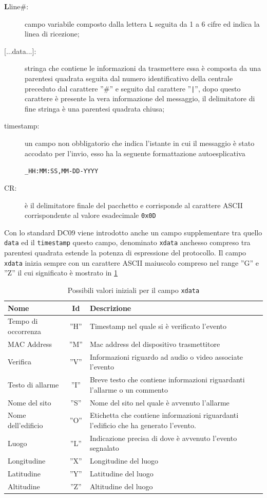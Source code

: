 \begin{description}
	\item[\textbf{L}line\#:] campo variabile composto dalla lettera \texttt{L} seguita da 1 a 6 cifre ed indica la linea di ricezione;
	\item[{[...data...]}:] stringa che contiene le informazioni da trasmettere essa è composta da una parentesi quadrata seguita dal numero identificativo della centrale preceduto dal carattere ''\#'' e seguito dal carattere ''\texttt{|}'', dopo questo carattere è presente la vera informazione del messaggio, il delimitatore di fine stringa è una parentesi quadrata chiusa;
	\item[timestamp:] un campo non obbligatorio che indica l'istante in cui il messaggio è stato accodato per l'invio, esso ha la seguente formattazione autoesplicativa
	\begin{center}
		\texttt{\_HH:MM:SS,MM-DD-YYYY}
	\end{center}
	\item[CR:] è il delimitatore finale del pacchetto e corrisponde al carattere ASCII corrispondente al valore esadecimale \texttt{0x0D}			
\end{description}
Con lo standard DC09 viene introdotto anche un campo supplementare tra quello \texttt{data} ed il \texttt{timestamp} questo campo, denominato \texttt{xdata} anchesso compreso tra parentesi quadrata estende la potenza di espressione del protocollo. Il campo \texttt{xdata} inizia sempre con un carattere ASCII maiuscolo compreso nel range ''G'' e ''Z'' il cui significato è mostrato in \tablename \ref{tab:xdata}
\begin{table}
	\begin{tabularx}{\linewidth}{|l|c|X|}
		\hline
		\textbf{Nome} & \textbf{Id} & \textbf{Descrizione} \\
		\hline
		Tempo di occorrenza & ''H'' & Timestamp nel quale si è verificato l'evento\\
		\hline
		MAC Address & ''M'' & Mac address del dispositivo trasmettitore\\
		\hline
		Verifica & ''V'' & Informazioni riguardo ad audio o video associate l'evento\\
		\hline
		Testo di allarme & ''I'' & Breve testo che contiene informazioni riguardanti l'allarme o un commento\\
		\hline
		Nome del sito & ''S'' & Nome del sito nel quale è avvenuto l'allarme\\
		\hline
		Nome dell'edificio & ''O'' & Etichetta che contiene informazioni riguardanti l'edificio che ha generato l'evento.\\
		\hline
		Luogo & ''L'' & Indicazione precisa di dove è avvenuto l'evento segnalato\\
		\hline
		Longitudine & ''X'' & Longitudine del luogo\\
		\hline
		Latitudine & ''Y'' & Latitudine del luogo\\
		\hline
		Altitudine & ''Z'' & Altitudine del luogo\\
		\hline
	\end{tabularx}
	\caption{Possibili valori iniziali per il campo \texttt{xdata}}\label{tab:xdata}
\end{table}
